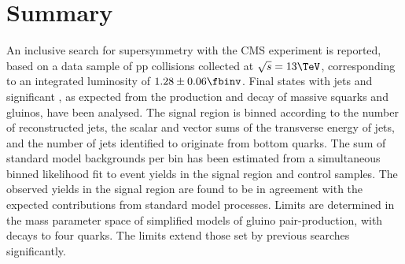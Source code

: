 \section{Summary}
\label{sec:summary}

An inclusive search for supersymmetry with the CMS experiment is
reported, based on a data sample of pp collisions collected at
$\sqrt{s} = 13\TeV$, corresponding to an integrated luminosity of $1.28
\pm 0.06 \fbinv$. Final states with jets and
significant \met, as expected from the production and decay of massive
squarks and gluinos, have been analysed.  The signal region is binned
according to the number of reconstructed jets, the scalar and vector sums of the
transverse energy of jets, and the number of jets identified to
originate from bottom quarks. The sum of standard model backgrounds
per bin has been estimated from a simultaneous binned likelihood fit
to event yields in the signal region and control samples. 
The observed yields in the signal region are found to be in agreement
with the expected contributions from standard model processes. Limits
are determined in the mass parameter space of simplified models of gluino pair-production, with decays to four quarks. 
The limits extend those set by previous searches significantly.


